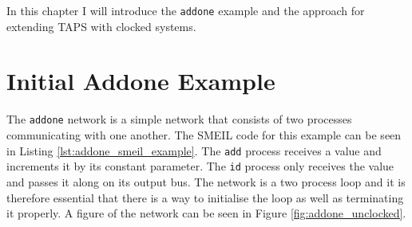 In this chapter I will introduce the \texttt{addone} example and the approach for extending TAPS with clocked systems.




%
%
%
%

%




\section{Initial Addone Example}
The \texttt{addone} network is a simple network that consists of two processes communicating with one another. The SMEIL code for this example can be seen in Listing \ref{lst:addone_smeil_example}. The \texttt{add} process receives a value and increments it by its constant parameter. The \texttt{id} process only receives the value and passes it along on its output bus.
The network is a two process loop and it is therefore essential that there is a way to initialise the loop as well as terminating it properly.
A figure of the network can be seen in Figure \ref{fig:addone_unclocked}.\\

